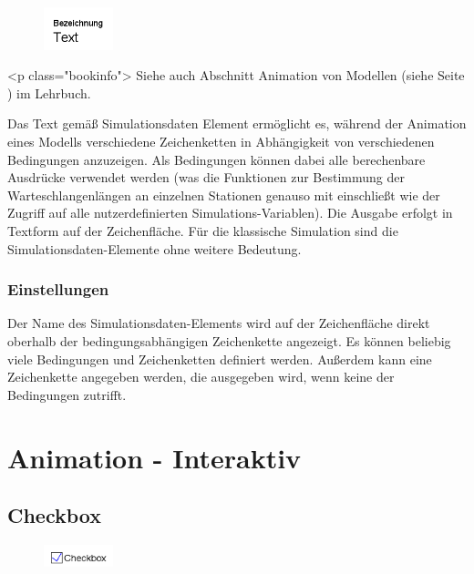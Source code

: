 \begin{figure}
\vspace{-22pt}
\includegraphics[width=2cm]{imageModelElementAnimationTextSelect.png}
\vspace{-22pt}
\end{figure}

<p class="bookinfo">
Siehe auch Abschnitt Animation von Modellen (siehe Seite \pageref{ref:book:5.4.3}) im Lehrbuch.

Das Text gemäß Simulationsdaten Element ermöglicht es, während der Animation eines Modells verschiedene
Zeichenketten in Abhängigkeit von verschiedenen Bedingungen anzuzeigen. Als Bedingungen können dabei
alle berechenbare Ausdrücke verwendet werden (was die Funktionen zur Bestimmung der Warteschlangenlängen
an einzelnen Stationen genauso mit einschließt wie der Zugriff auf alle nutzerdefinierten Simulations-Variablen).
Die Ausgabe erfolgt in Textform auf der Zeichenfläche. Für die klassische Simulation sind die Simulationsdaten-Elemente
ohne weitere Bedeutung.

\subsection*{Einstellungen}

Der Name des Simulationsdaten-Elements wird auf der Zeichenfläche direkt oberhalb der bedingungsabhängigen Zeichenkette angezeigt.
Es können beliebig viele Bedingungen und Zeichenketten definiert werden.
Außerdem kann eine Zeichenkette angegeben werden, die ausgegeben wird, wenn keine der Bedingungen zutrifft.





\chapter{Animation - Interaktiv}

\section{Checkbox}
\label{ref:ModelElementInteractiveCheckbox}

\begin{figure}
\vspace{-22pt}
\includegraphics[width=2cm]{imageModelElementInteractiveCheckbox.png}
\vspace{-22pt}
\end{figure}


